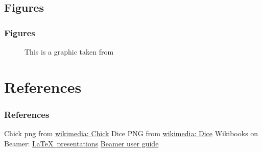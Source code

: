 \documentclass{beamer}
\begin{document}
		\subsection{Figures}
		\begin{frame}
			\frametitle{Figures}
				\begin{figure}
				\centering
					\caption{This is a graphic taken from \cite{Dice}}
				\end{figure}
		\end{frame}
		
\section{References}
		\begin{frame}
			\frametitle{References}		
				\begin{thebibliography}{99}\small
				Chick png from \href{http://commons.wikimedia.org/wiki/File:Chick1.png}{wikimedia: Chick}
				Dice PNG from \href{http://commons.wikimedia.org/wiki/File:PNG_transparency_demonstration_1.png}{wikimedia: Dice}
			Wikibooks on Beamer: \href{http://en.wikibooks.org/wiki/LaTeX/Presentations}{\LaTeX\ presentations}
			\href{http://dante.ctan.org/get/macros/latex/contrib/beamer/doc/beameruserguide.pdf}{Beamer user guide}
	 \end{thebibliography}
		\end{frame}
\end{document}
